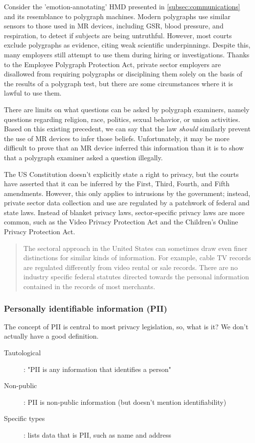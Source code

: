 Consider the 'emotion-annotating'  HMD presented in \autoref{subsec:communications} and its resemblance to polygraph machines. Modern polygraphs use similar sensors to those used in MR devices, including GSR, blood pressure, and respiration, to detect if subjects are being untruthful. However, most courts exclude polygraphs as evidence, citing weak scientific underpinnings. Despite this, many employers still attempt to use them during hiring or investigations. Thanks to the Employee Polygraph Protection Act, private sector employers are disallowed from requiring polygraphs or disciplining them solely on the basis of the results of a polygraph test, but there are some circumstances where it is lawful to use them.

There are limits on what questions can be asked by polygraph examiners, namely questions regarding religion, race, politics, sexual behavior, or union activities. Based on this existing precedent, we can say that the law \emph{should} similarly prevent the use of MR devices to infer those beliefs. Unfortunately, it may be more difficult to prove that an MR device inferred this information than it is to show that a polygraph examiner asked a question illegally.

The US Constitution doesn't explicitly state a right to privacy, but the courts have asserted that it can be inferred by the First, Third, Fourth, and Fifth amendments. However, this only applies to intrusions by the government; instead, private sector data collection and use are regulated by a patchwork of federal and state laws. Instead of blanket privacy laws, sector-specific privacy laws are more common, such as the Video Privacy Protection Act and the Children's Online Privacy Protection Act.

\begin{quote}
The sectoral approach in the United States can sometimes draw even finer distinctions for similar kinds of information. For example, cable TV records are regulated differently from video rental or sale records. There are no industry specific federal statutes directed towards the personal information contained in the records of most merchants.\cite{solove2018information}
\end{quote} 

\subsubsection{Personally identifiable information (PII)}
The concept of PII is central to most privacy legislation, so, what is it? We don't actually have a good definition.
\begin{description}
	\item[Tautological]: "PII is any information that identifies a person"
	\item[Non-public]: PII is non-public information (but doesn't mention identifiability)
	\item[Specific types]: lists data that is PII, such as name and address
\end{description}

